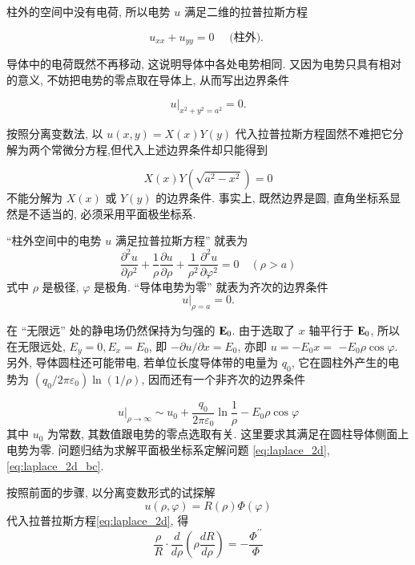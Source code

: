 柱外的空间中没有电荷, 所以电势 $u$ 满足二维的拉普拉斯方程

$$
u_{x x}+u_{y y}=0 \quad \text { (柱外). }
$$

导体中的电荷既然不再移动, 这说明导体中各处电势相同. 又因为电势只具有相对的意义, 不妨把电势的零点取在导体上, 从而写出边界条件

$$
\left.u\right|_{x^{2}+y^{2}=a^{2}}=0 .
$$

按照分离变数法, 以 $u(x, y)=X(x) Y(y)$ 代入拉普拉斯方程固然不难把它分解为两个常微分方程,但代入上述边界条件却只能得到

$$
X(x) Y\left(\sqrt{a^{2}-x^{2}}\right)=0
$$
不能分解为 $X(x)$ 或 $Y(y)$ 的边界条件. 事实上, 既然边界是圆, 直角坐标系显然是不适当的, 必须采用平面极坐标系.

“柱外空间中的电势 $u$ 满足拉普拉斯方程” 就表为
\begin{equation}
    \frac{\partial^{2} u}{\partial \rho^{2}}+\frac{1}{\rho} \frac{\partial u}{\partial \rho}+
    \frac{1}{\rho^{2}} \frac{\partial^{2} u}{\partial \varphi^{2}}=0 \quad(\rho>a)
    \label{eq:laplace_2d}
\end{equation}
式中 $\rho$ 是极径, $\varphi$ 是极角. “导体电势为零” 就表为齐次的边界条件
\begin{equation}
    \left.u\right|_{\rho=a}=0 .
    \label{eq:laplace_2d_bc}
\end{equation}


在 “无限远” 处的静电场仍然保持为匀强的 ${\mathbf{E}}_{0}$. 由于选取了 $x$ 轴平行于 
${\mathbf{E}}_{0}$, 所以在无限远处, $E_{y}=0, E_{x}=E_{0}$, 即 $-\partial u / \partial x=E_{0}$, 
亦即 $u=-E_{0} x=$ $-E_{0} \rho \cos \varphi$. 另外, 导体圆柱还可能带电, 
若单位长度导体带的电量为 $q_{0}$, 它在圆柱外产生的电势为 $\left(q_{0} / 2 \pi \varepsilon_{0}\right) \ln (1 / \rho)$, 
因而还有一个非齐次的边界条件

\begin{equation}
    \left.u\right|_{\rho \rightarrow \infty} \sim u_{0}+
    \frac{q_{0}}{2 \pi \varepsilon_{0}} \ln \frac{1}{\rho}-E_{0} \rho \cos \varphi
    \label{eq:u_rho_infty}
\end{equation}
其中 $u_{0}$ 为常数, 其数值跟电势的零点选取有关. 这里要求其满足在圆柱导体侧面上电势为零. 
问题归结为求解平面极坐标系定解问题 \eqref{eq:laplace_2d}, \eqref{eq:laplace_2d_bc}.

按照前面的步骤, 以分离变数形式的试探解
$$
u(\rho, \varphi)=R(\rho) \Phi\left(\varphi\right)
$$
代入拉普拉斯方程\eqref{eq:laplace_2d}, 得
$$
\frac{\rho}{R} \cdot \frac{d}{d \rho}\left(\rho \frac{d R}{d \rho}\right)=-\frac{\Phi^{\prime \prime}}{\Phi}
$$

